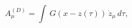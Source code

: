 \begin{equation}
A_{\mu}^{(D)}=\int \, G(x-z(\tau))\, \dot{z}_{\mu}\, d\tau,
\label{vec1}
\end{equation}

